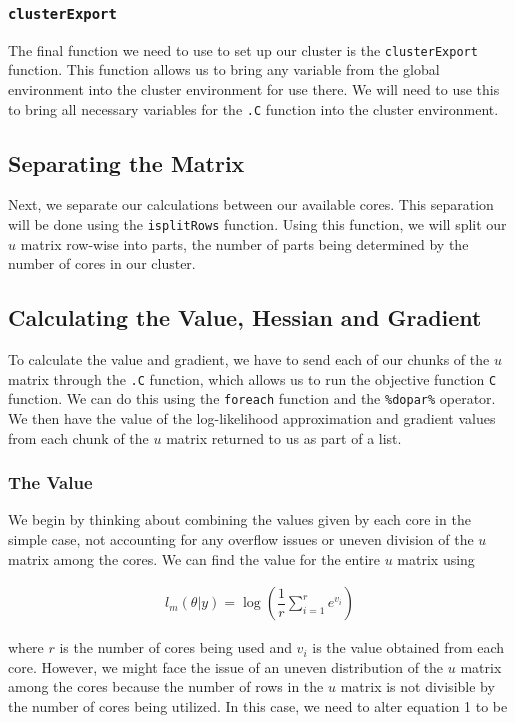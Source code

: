 \documentclass{article}
\begin{document}
\subsubsection{\texttt{clusterExport}}
The final function we need to use to set up our cluster is the \texttt{clusterExport} function. This function allows us to bring any variable from the global environment into the cluster environment for use there. We will need to use this to bring all necessary variables for the \texttt{.C} function into the cluster environment.

\subsection{Separating the Matrix}
Next, we separate our calculations between our available cores. This separation will be done using the \texttt{isplitRows} function. Using this function, we will split our $u$ matrix row-wise into parts, the number of parts being determined by the number of cores in our cluster.

\subsection{Calculating the Value, Hessian and Gradient}
To calculate the value and gradient, we have to send each of our chunks of the $u$ matrix through the \texttt{.C} function, which allows us to run the objective function \texttt{C} function. We can do this using the \texttt{foreach} function and the \texttt{\%dopar\%} operator. We then have the value of the log-likelihood approximation and gradient values from each chunk of the $u$ matrix returned to us as part of a list.

\subsubsection{The Value}
We begin by thinking about combining the values given by each core in the simple case, not accounting for any overflow issues or uneven division of the $u$ matrix among the cores. We can find the value for the entire $u$ matrix using

\begin{align}
l_m(\theta|y) = \log\left(\dfrac{1}{r}\sum\limits_{i=1}^r e^{v_i}\right)
\end{align}

\noindent where $r$ is the number of cores being used and $v_i$ is the value obtained from each core. However, we might face the issue of an uneven distribution of the $u$ matrix among the cores because the number of rows in the $u$ matrix is not divisible by the number of cores being utilized. In this case, we need to alter equation 1 to be
\end{document}
